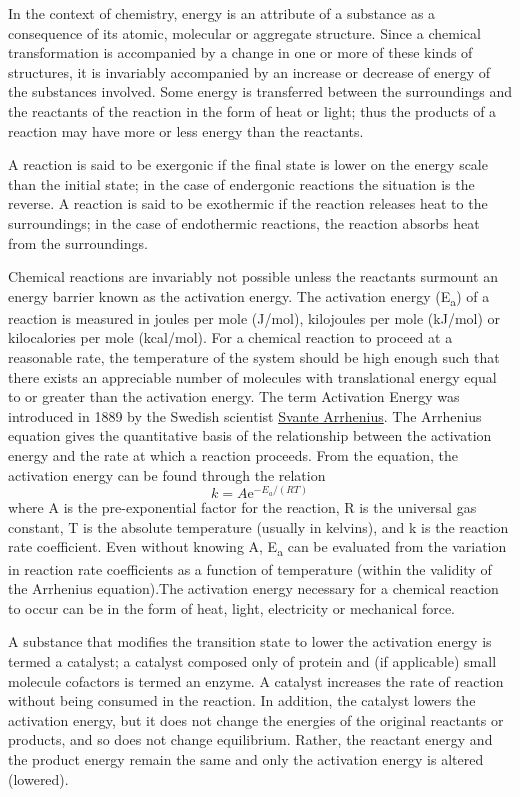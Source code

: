 In the context of chemistry, energy is an attribute of a substance as a consequence of its atomic, molecular or aggregate structure. Since a chemical transformation is accompanied by a change in one or more of these kinds of structures, it is invariably accompanied by an increase or decrease of energy of the substances involved. Some energy is transferred between the surroundings and the reactants of the reaction in the form of heat or light; thus the products of a reaction may have more or less energy than the reactants.

A reaction is said to be exergonic if the final state is lower on the energy scale than the initial state; in the case of endergonic reactions the situation is the reverse. A reaction is said to be exothermic if the reaction releases heat to the surroundings; in the case of endothermic reactions, the reaction absorbs heat from the surroundings.

Chemical reactions are invariably not possible unless the reactants surmount an energy barrier known as the activation energy. The activation energy (E\textsubscript{a}) of a reaction is measured in joules per mole (J/mol), kilojoules per mole (kJ/mol) or kilocalories per mole (kcal/mol). For a chemical reaction to proceed at a reasonable rate, the temperature of the system should be high enough such that there exists an appreciable number of molecules with translational energy equal to or greater than the activation energy. The term Activation Energy was introduced in 1889 by the Swedish scientist \href{https://en.wikipedia.org/wiki/Svante_Arrhenius}{Svante Arrhenius}. The Arrhenius equation gives the quantitative basis of the relationship between the activation energy and the rate at which a reaction proceeds. From the equation, the activation energy can be found through the relation
\[ k=A\mathrm{e}^{-E_a/(RT)} \]
where A is the pre-exponential factor for the reaction, R is the universal gas constant, T is the absolute temperature (usually in kelvins), and k is the reaction rate coefficient. Even without knowing A, E\textsubscript{a} can be evaluated from the variation in reaction rate coefficients as a function of temperature (within the validity of the Arrhenius equation).The activation energy necessary for a chemical reaction to occur can be in the form of heat, light, electricity or mechanical force.

A substance that modifies the transition state to lower the activation energy is termed a catalyst; a catalyst composed only of protein and (if applicable) small molecule cofactors is termed an enzyme. A catalyst increases the rate of reaction without being consumed in the reaction. In addition, the catalyst lowers the activation energy, but it does not change the energies of the original reactants or products, and so does not change equilibrium. Rather, the reactant energy and the product energy remain the same and only the activation energy is altered (lowered).



